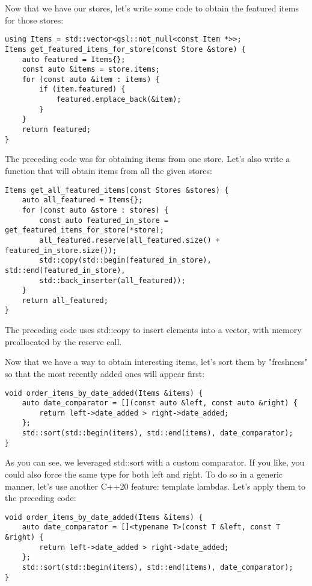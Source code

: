 Now that we have our stores, let's write some code to obtain the featured items for those stores:

\begin{lstlisting}[style=styleCXX]
using Items = std::vector<gsl::not_null<const Item *>>;
Items get_featured_items_for_store(const Store &store) {
	auto featured = Items{};
	const auto &items = store.items;
	for (const auto &item : items) {
		if (item.featured) {
			featured.emplace_back(&item);
		}
	}
	return featured;
}
\end{lstlisting}

The preceding code was for obtaining items from one store. Let's also write a function that will obtain items from all the given stores:

\begin{lstlisting}[style=styleCXX]
Items get_all_featured_items(const Stores &stores) {
	auto all_featured = Items{};
	for (const auto &store : stores) {
		const auto featured_in_store = get_featured_items_for_store(*store);
		all_featured.reserve(all_featured.size() + featured_in_store.size());
		std::copy(std::begin(featured_in_store), std::end(featured_in_store),
		std::back_inserter(all_featured));
	}
	return all_featured;
}
\end{lstlisting}

The preceding code uses std::copy to insert elements into a vector, with memory preallocated by the reserve call.

Now that we have a way to obtain interesting items, let's sort them by "freshness" so that the most recently added ones will appear first:

\begin{lstlisting}[style=styleCXX]
void order_items_by_date_added(Items &items) {
	auto date_comparator = [](const auto &left, const auto &right) {
		return left->date_added > right->date_added;
	};
	std::sort(std::begin(items), std::end(items), date_comparator);
}
\end{lstlisting}

As you can see, we leveraged std::sort with a custom comparator. If you like, you could also force the same type for both left and right. To do so in a generic manner, let's use another C++20 feature: template lambdas. Let's apply them to the preceding code:

\begin{lstlisting}[style=styleCXX]
void order_items_by_date_added(Items &items) {
	auto date_comparator = []<typename T>(const T &left, const T &right) {
		return left->date_added > right->date_added;
	};
	std::sort(std::begin(items), std::end(items), date_comparator);
}
\end{lstlisting}

